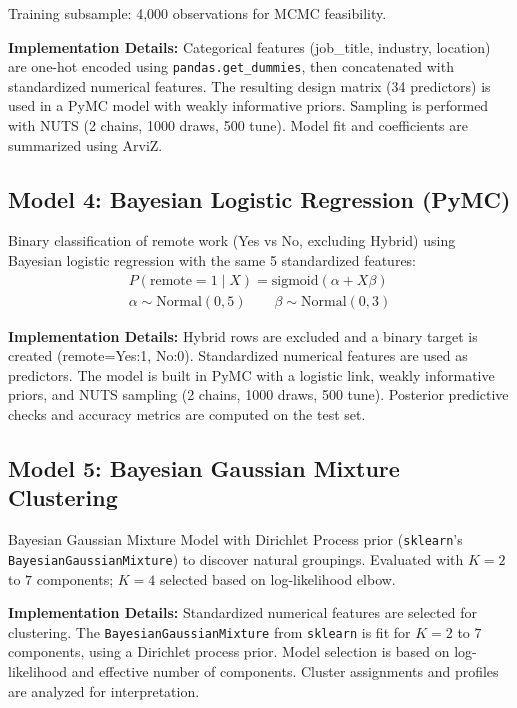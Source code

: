 \documentclass[11pt,a4paper]{article}
\begin{document}
\noindent Training subsample: 4,000 observations for MCMC feasibility.

\vspace{0.5em}
\noindent \textbf{Implementation Details:} Categorical features (job\_title, industry, location) are one-hot encoded using \texttt{pandas.get\_dummies}, then concatenated with standardized numerical features. The resulting design matrix (34 predictors) is used in a PyMC model with weakly informative priors. Sampling is performed with NUTS (2 chains, 1000 draws, 500 tune). Model fit and coefficients are summarized using ArviZ.

\subsection{Model 4: Bayesian Logistic Regression (PyMC)}
Binary classification of remote work (Yes vs No, excluding Hybrid) using Bayesian logistic regression with the same 5 standardized features:
\vspace{-0.5em}
\begin{gather*}
P(\text{remote}=1 \mid X) = \text{sigmoid}(\alpha + X\beta) \\
\alpha \sim \text{Normal}(0, 5) \qquad \beta \sim \text{Normal}(0, 3)
\end{gather*}

\noindent \textbf{Implementation Details:} Hybrid rows are excluded and a binary target is created (remote=Yes:1, No:0). Standardized numerical features are used as predictors. The model is built in PyMC with a logistic link, weakly informative priors, and NUTS sampling (2 chains, 1000 draws, 500 tune). Posterior predictive checks and accuracy metrics are computed on the test set.

\subsection{Model 5: Bayesian Gaussian Mixture Clustering}
Bayesian Gaussian Mixture Model with Dirichlet Process prior (\texttt{sklearn}'s \texttt{BayesianGaussianMixture}) to discover natural groupings. Evaluated with $K=2$ to $7$ components; $K=4$ selected based on log-likelihood elbow.

\vspace{0.5em}
\noindent \textbf{Implementation Details:} Standardized numerical features are selected for clustering. The \texttt{BayesianGaussianMixture} from \texttt{sklearn} is fit for $K=2$ to $7$ components, using a Dirichlet process prior. Model selection is based on log-likelihood and effective number of components. Cluster assignments and profiles are analyzed for interpretation.
\end{document}
